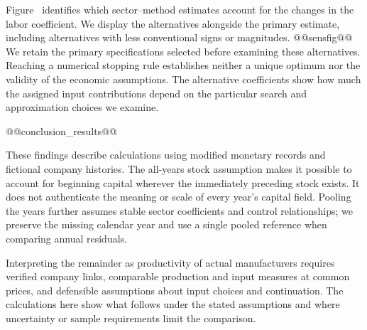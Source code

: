 Figure~ identifies which sector--method estimates account for the changes in the labor coefficient. We display the alternatives alongside the primary estimate, including alternatives with less conventional signs or magnitudes.
@@sensfig@@
We retain the primary specifications selected before examining these alternatives. Reaching a numerical stopping rule establishes neither a unique optimum nor the validity of the economic assumptions. The alternative coefficients show how much the assigned input contributions depend on the particular search and approximation choices we examine.

@@conclusion_results@@

These findings describe calculations using modified monetary records and fictional company histories. The all-years stock assumption makes it possible to account for beginning capital wherever the immediately preceding stock exists. It does not authenticate the meaning or scale of every year's capital field. Pooling the years further assumes stable sector coefficients and control relationships; we preserve the missing calendar year and use a single pooled reference when comparing annual residuals.

Interpreting the remainder as productivity of actual manufacturers requires verified company links, comparable production and input measures at common prices, and defensible assumptions about input choices and continuation. The calculations here show what follows under the stated assumptions and where uncertainty or sample requirements limit the comparison.

